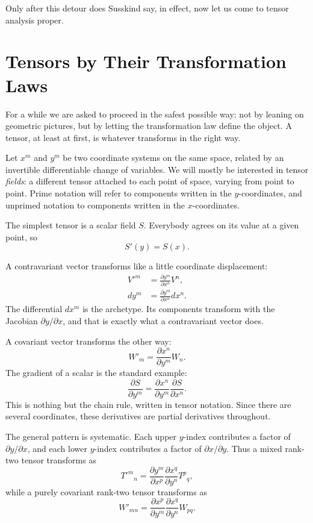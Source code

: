 Only after this detour does Susskind say, in effect, now let us come to tensor analysis proper.

\section{Tensors by Their Transformation Laws}

For a while we are asked to proceed in the safest possible way: not by leaning on geometric pictures, but by letting the transformation law define the object. A tensor, at least at first, is whatever transforms in the right way.

Let \(x^m\) and \(y^m\) be two coordinate systems on the same space, related by an invertible differentiable change of variables. We will mostly be interested in tensor \emph{fields}: a different tensor attached to each point of space, varying from point to point. Prime notation will refer to components written in the \(y\)-coordinates, and unprimed notation to components written in the \(x\)-coordinates.

The simplest tensor is a scalar field \(S\). Everybody agrees on its value at a given point, so
\begin{equation}
S'(y)=S(x).
\end{equation}

A contravariant vector transforms like a little coordinate displacement:
\begin{align}
V'^m &= \frac{\partial y^m}{\partial x^n}V^n, \\
dy^m &= \frac{\partial y^m}{\partial x^n}dx^n.
\end{align}
The differential \(dx^m\) is the archetype. Its components transform with the Jacobian \(\partial y/\partial x\), and that is exactly what a contravariant vector does.

A covariant vector transforms the other way:
\begin{equation}
W'_m=\frac{\partial x^n}{\partial y^m}W_n.
\end{equation}
The gradient of a scalar is the standard example:
\begin{equation}
\frac{\partial S}{\partial y^m}
=
\frac{\partial x^n}{\partial y^m}\frac{\partial S}{\partial x^n}.
\end{equation}
This is nothing but the chain rule, written in tensor notation. Since there are several coordinates, these derivatives are partial derivatives throughout.

The general pattern is systematic. Each upper \(y\)-index contributes a factor of \(\partial y/\partial x\), and each lower \(y\)-index contributes a factor of \(\partial x/\partial y\). Thus a mixed rank-two tensor transforms as
\begin{equation}
T'^m{}_n
=
\frac{\partial y^m}{\partial x^p}
\frac{\partial x^q}{\partial y^n}
T^p{}_q,
\end{equation}
while a purely covariant rank-two tensor transforms as
\begin{equation}
W'_{mn}
=
\frac{\partial x^p}{\partial y^m}
\frac{\partial x^q}{\partial y^n}
W_{pq}.
\end{equation}

